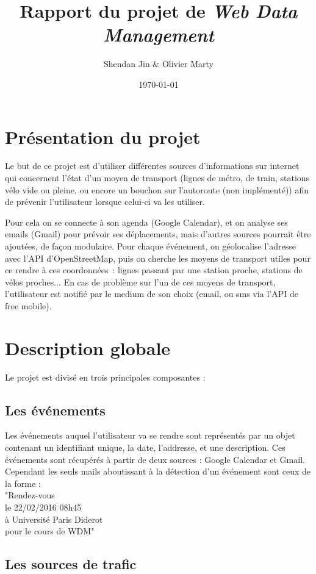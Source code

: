 \documentclass[a4paper, 8pt]{article}
\title{\vspace{-2cm}Rapport du projet de \emph{Web Data Management}}
\author{Shendan Jin \& Olivier Marty}
\date\today
\begin{document}
\maketitle

\section{Présentation du projet}

Le but de ce projet est d'utiliser différentes sources d'informations sur
internet qui concernent l'état d'un moyen de transport (lignes de
métro, de train, stations vélo vide ou pleine, ou encore un bouchon sur
l'autoroute (non implémenté)) afin de prévenir l'utilisateur lorsque celui-ci va
les utiliser.

Pour cela on se connecte à son agenda (Google Calendar), et on analyse ses emails
(Gmail) pour prévoir ses déplacements, mais d'autres sources pourrait être
ajoutées, de façon modulaire.
Pour chaque événement, on géolocalise l'adresse avec l'API d'OpenStreetMap,
puis on cherche les moyens de transport utiles pour ce rendre à ces coordonnées~:
lignes passant par une station proche, stations de vélos proches...
En cas de problème sur l'un de ces moyens de transport, l'utilisateur est
notifié par le medium de son choix (email, ou sms via l'API de free mobile).

\section{Description globale}

Le projet est divisé en trois principales composantes :

\subsection{Les événements}

Les événements auquel l'utilisateur va se rendre sont représentés par un objet
contenant un identifiant unique, la date, l'addresse, et une description.
Ces événements sont récupérés à partir de deux sources : Google Calendar et
Gmail.
Cependant les seuls mails aboutissant à la détection d'un événement sont ceux de la forme :\\
"Rendez-vous\\
le 22/02/2016 08h45\\
à Université Paris Diderot\\
pour le cours de WDM"


\subsection{Les sources de trafic}
\end{document}

